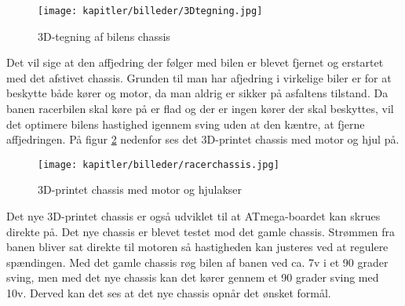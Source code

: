 \begin{figure}[ht]
    \centering
    \texttt{[image: kapitler/billeder/3Dtegning.jpg]}
    \caption{3D-tegning af bilens chassis}
    \label{fig:3Dtegning}
\end{figure}


Det vil sige at den affjedring der følger med bilen er blevet fjernet og erstartet med det afstivet chassis. Grunden til man har afjedring i virkelige biler er for at beskytte både kører og motor, da man aldrig er sikker på asfaltens tilstand. Da banen racerbilen skal køre på er flad og der er ingen kører der skal beskyttes, vil det optimere bilens hastighed igennem sving uden at den kæntre, at fjerne affjedringen. På figur \ref{fig:racerchassis} nedenfor ses det 3D-printet chassis med motor og hjul på.

\begin{figure}[ht]
    \centering
    \texttt{[image: kapitler/billeder/racerchassis.jpg]}
    \caption{3D-printet chassis med motor og hjulakser}
    \label{fig:racerchassis}
\end{figure}

Det nye 3D-printet chassis er også udviklet til at ATmega-boardet kan skrues direkte på. Det nye chassis er blevet testet mod det gamle chassis. Strømmen fra banen bliver sat direkte til motoren så hastigheden kan justeres ved at regulere spændingen. Med det gamle chassis røg bilen af banen ved ca. 7v i et 90 grader sving, men med det nye chassis kan det kører gennem et 90 grader sving med 10v. Derved kan det ses at det nye chassis opnår det ønsket formål. 



